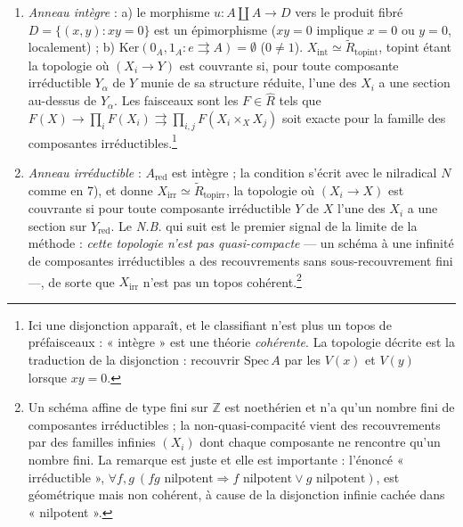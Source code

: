 \documentclass[11pt,a4paper]{article}
\begin{document}
\begin{enumerate}
\item[7)] \emph{Anneau intègre} : a) le morphisme $u : A \amalg A \to D$
vers le produit fibré $D = \{(x,y) : xy = 0\}$ est un épimorphisme
($xy = 0$ implique $x = 0$ ou $y = 0$, localement) ; b) $\mathrm{Ker}(0_{A},
1_{A} : e \rightrightarrows A) = \emptyset$ ($0 \neq 1$). $X_{\mathrm{int}}
\simeq \widetilde{R}_{\mathrm{topint}}$, topint étant la topologie où
$(X_{i} \to Y)$ est couvrante si, pour toute composante irréductible
$Y_{\alpha}$ de $Y$ munie de sa structure réduite, l'une des $X_{i}$ a une
section au-dessus de $Y_{\alpha}$. Les faisceaux sont les $F \in
\widehat{R}$ tels que $F(X) \to \prod_{i} F(X_{i}) \rightrightarrows
\prod_{i,j} F(X_{i} \times_{X} X_{j})$ soit exacte pour la famille des
composantes irréductibles.\footnote{Ici une disjonction apparaît, et le
classifiant n'est plus un topos de préfaisceaux : « intègre » est une
théorie \emph{cohérente}. La topologie décrite est la traduction de la
disjonction : recouvrir $\mathrm{Spec}\,A$ par les $V(x)$ et $V(y)$
lorsque $xy = 0$.}

\item[8)] \emph{Anneau irréductible} : $A_{\mathrm{red}}$ est intègre ; la
condition s'écrit avec le nilradical $N$ comme en 7), et donne
$X_{\mathrm{irr}} \simeq \widetilde{R}_{\mathrm{topirr}}$, la topologie où
$(X_{i} \to X)$ est couvrante si pour toute composante irréductible $Y$ de
$X$ l'une des $X_{i}$ a une section sur $Y_{\mathrm{red}}$. Le \emph{N.B.}
qui suit est le premier signal de la limite de la méthode : \emph{cette
topologie n'est pas quasi-compacte} — un schéma à une infinité de
composantes irréductibles a des recouvrements sans sous-recouvrement
fini —, de sorte que $X_{\mathrm{irr}}$ n'est pas un topos
cohérent.\footnote{Un schéma affine de type fini sur $\mathbb{Z}$ est
noethérien et n'a qu'un nombre fini de composantes irréductibles ; la
non-quasi-compacité vient des recouvrements par des familles infinies
$(X_{i})$ dont chaque composante ne rencontre qu'un nombre fini. La
remarque est juste et elle est importante : l'énoncé « irréductible »,
$\forall f, g\ (fg \text{ nilpotent} \Rightarrow f \text{ nilpotent} \vee
g \text{ nilpotent})$, est géométrique mais non cohérent, à cause de la
disjonction infinie cachée dans « nilpotent ».}


\end{enumerate}
\end{document}
